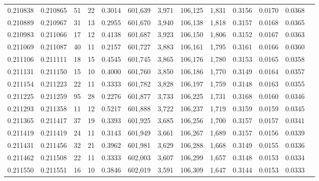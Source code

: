 \begin{tabular}{rrrrrrrrrrrrr}
0.210838 & 0.210865 &    51 &  22 &                                     0.3014 & 601,639 &   3,971 & 106,125 &   1,831 & 0.3156 & 0.0170 & 0.0368 \\
0.210889 & 0.210967 &    31 &  13 &                                     0.2955 & 601,670 &   3,940 & 106,138 &   1,818 & 0.3157 & 0.0168 & 0.0365 \\
0.210983 & 0.211066 &    17 &  12 &                                     0.4138 & 601,687 &   3,923 & 106,150 &   1,806 & 0.3152 & 0.0167 & 0.0363 \\
0.211069 & 0.211087 &    40 &  11 &                                     0.2157 & 601,727 &   3,883 & 106,161 &   1,795 & 0.3161 & 0.0166 & 0.0360 \\
0.211106 & 0.211111 &    18 &  15 &                                     0.4545 & 601,745 &   3,865 & 106,176 &   1,780 & 0.3153 & 0.0165 & 0.0358 \\
0.211131 & 0.211150 &    15 &  10 &                                     0.4000 & 601,760 &   3,850 & 106,186 &   1,770 & 0.3149 & 0.0164 & 0.0357 \\
0.211154 & 0.211223 &    22 &  11 &                                     0.3333 & 601,782 &   3,828 & 106,197 &   1,759 & 0.3148 & 0.0163 & 0.0355 \\
0.211225 & 0.211259 &    95 &  28 &                                     0.2276 & 601,877 &   3,733 & 106,225 &   1,731 & 0.3168 & 0.0160 & 0.0346 \\
0.211293 & 0.211358 &    11 &  12 &                                     0.5217 & 601,888 &   3,722 & 106,237 &   1,719 & 0.3159 & 0.0159 & 0.0345 \\
0.211365 & 0.211417 &    37 &  19 &                                     0.3393 & 601,925 &   3,685 & 106,256 &   1,700 & 0.3157 & 0.0157 & 0.0341 \\
0.211419 & 0.211419 &    24 &  11 &                                     0.3143 & 601,949 &   3,661 & 106,267 &   1,689 & 0.3157 & 0.0156 & 0.0339 \\
0.211431 & 0.211456 &    32 &  21 &                                     0.3962 & 601,981 &   3,629 & 106,288 &   1,668 & 0.3149 & 0.0155 & 0.0336 \\
0.211462 & 0.211508 &    22 &  11 &                                     0.3333 & 602,003 &   3,607 & 106,299 &   1,657 & 0.3148 & 0.0153 & 0.0334 \\
0.211550 & 0.211551 &    16 &  10 &                                     0.3846 & 602,019 &   3,591 & 106,309 &   1,647 & 0.3144 & 0.0153 & 0.0333 \\

\end{tabular}
